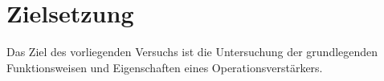 \section{Zielsetzung}
Das Ziel des vorliegenden Versuchs ist die Untersuchung der grundlegenden Funktionsweisen und Eigenschaften eines Operationsverstärkers.